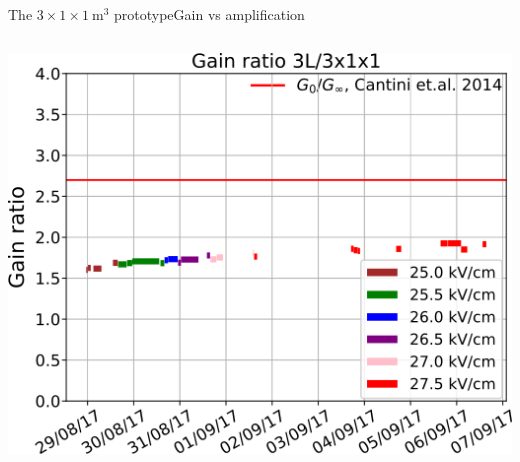 \documentclass[10pt]{beamer}
\begin{document}
\begin{frame}{The \texorpdfstring{$3 \times 1 \times \SI{1}{\meter\cubed}$}{311} prototype}{Gain vs amplification}
\begin{scriptsize}
\begin{columns}
\begin{column}{0.5\textwidth}
	    			\vspace{0.2cm}
	    			\includegraphics[width=.9\textwidth]{figures/311/ratio_vs_time.png}\\
	    		\end{column}
	    	\end{columns}
    	\end{scriptsize}
    \end{frame}
    
\end{document}

